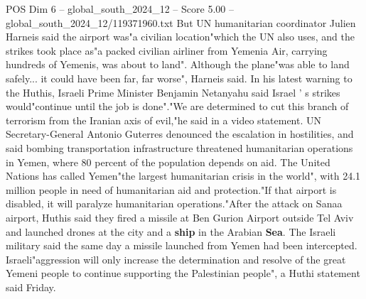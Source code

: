 \begin{textsample}{POS Dim 6 – global\_south\_2024\_12 – Score 5.00 – global\_south\_2024\_12/119371960.txt}
But UN humanitarian coordinator Julien Harneis said the airport was"a civilian location"which the UN also uses, and the strikes took place as"a packed civilian airliner from Yemenia Air, carrying hundreds of Yemenis, was about to land".
Although the plane"was able to land safely... it could have been far, far worse", Harneis said.
In his latest warning to the Huthis, Israeli Prime Minister Benjamin Netanyahu said Israel ' s strikes would"continue until the job is done"."We are determined to cut this branch of terrorism from the Iranian axis of evil,"he said in a video statement.
UN Secretary-General Antonio Guterres denounced the escalation in hostilities, and said bombing transportation infrastructure threatened humanitarian operations in Yemen, where 80 percent of the population depends on aid.
The United Nations has called Yemen"the largest humanitarian crisis in the world", with 24.1 million people in need of humanitarian aid and protection."If that airport is disabled, it will paralyze humanitarian operations."After the attack on Sanaa airport, Huthis said they fired a missile at Ben Gurion Airport outside Tel Aviv and launched drones at the city and a \textbf{ship} in the Arabian \textbf{Sea}.
The Israeli military said the same day a missile launched from Yemen had been intercepted.
Israeli"aggression will only increase the determination and resolve of the great Yemeni people to continue supporting the Palestinian people", a Huthi statement said Friday.

\end{textsample}

